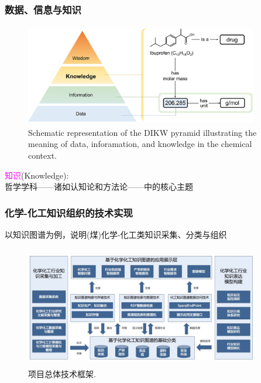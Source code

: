 \frame
{
	\frametitle{数据、信息与知识}
\begin{figure}[h!]
\centering
\vskip -10pt
\includegraphics[height=1.75in,width=4.00in,viewport=0 0 1490 615,clip]{Figures/DIKW_pyramid-illustrating-data_information-knowledge.png}
\caption{\tiny\textrm{Schematic representation of the DIKW pyramid illustrating the meaning of data, inforamation, and knowledge in the chemical context.\cite{ACR56-128_2023}}}%
\label{Fig:Knowledge-based_system}
\end{figure}
\textcolor{magenta}{知识}\textrm{(Knowledge)}:\\
哲学学科——诸如认知论和方法论——中的核心主题
}

\begin{frame}
	\frametitle{化学-化工知识组织的技术实现}
	以知识图谱为例，说明(煤)化学-化工类知识采集、分类与组织
\begin{figure}[h!]
\centering
\includegraphics[height=2.08in,width=4.00in,viewport=0 0 245 113,clip]{Figures/KG_Chem-Frame.png}
\caption{\tiny 项目总体技术框架.}%
\label{KG_Chem-Frame}
\end{figure}
\end{frame}

